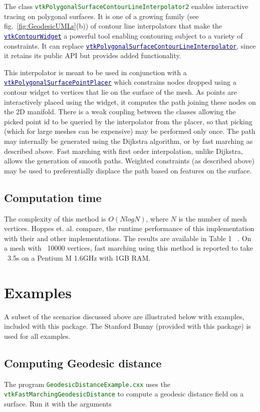\documentclass{InsightArticle}
\def\code#1{\small\textcolor{darkgreen}{\texttt{#1}}}
\def\vtk#1{\href{www.vtk.org/doc/nightly/html/class#1.html}{\small\textcolor{darkblue}{\texttt{#1}}}}
\begin{document}
The class \code{vtkPolygonalSurfaceContourLineInterpolator2} enables interactive tracing on polygonal surfaces. It is one of a growing family (see fig.~\ref{fig:GeodesicUMLs}(b))
of contour line interpolators that make the \vtk{vtkContourWidget} a powerful tool enabling contouring subject to a variety of constraints. 
It can replace \vtk{vtkPolygonalSurfaceContourLineInterpolator}, since it retains its public API but provides added functionality.

This interpolator is meant to be used in conjunction with a \vtk{vtkPolygonalSurfacePointPlacer} which constrains nodes dropped using a contour widget to vertices that lie on the surface of the mesh.
As points are interactively placed using the widget, it computes the path joining these nodes on the 2D manifold. There is a weak coupling between the classes allowing the picked point id to be queried by the interpolator from the placer, so that picking (which for large meshes can be expensive) may be performed only once.
The path may internally be generated using the Dijkstra algorithm, or by fast marching as described above. Fast marching with first order interpolation, unlike Dijkstra, allows the generation of smooth paths. Weighted constraints (as described above) may be used to preferentially displace the path based on features on the surface.

\subsection{Computation time}
The complexity of this method is $O(N log N)$, where $N$ is the number of mesh vertices. Hoppes et. al. compare, the runtime performance of this implementation with their and other implementations. The results are available in Table 1 ~\cite{Hoppes05}. On a mesh with ~10000 vertices, fast marching using this method is reported to take ~3.5s on a Pentium M 1.6GHz with 1GB RAM.


\section{Examples}

A subset of the scenarios discussed above are illustrated below with examples, included with this package. The Stanford Bunny (provided with this package) is used for all examples.

\subsection{Computing Geodesic distance}
The program \code{GeodesicDistanceExample.cxx} uses the \code{vtkFastMarchingGeodesicDistance} to compute a geodesic distance field on a surface.
Run it with the arguments
\end{document}
